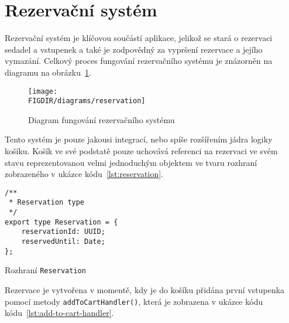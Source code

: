 \pagebreak
\section{Rezervační systém}
\label{sec:implementace-rezervace}
Rezervační systém je klíčovou součástí aplikace, jelikož se stará o rezervaci sedadel a vstupenek a také je zodpovědný za vypršení rezervace a jejího vymazání.
Celkový proces fungování rezervačního systému je znázorněn na diagramu na obrázku~\ref{fig:reservation-system-diagram}.

\begin{figure}[H]
    \centering
    \caption{Diagram fungování rezervačního systému}
    \texttt{[image: \\FIGDIR/diagrams/reservation]}
    \source{}
    \label{fig:reservation-system-diagram}
\end{figure}

Tento systém je pouze jakousi integrací, nebo spíše rozšířením jádra logiky košíku.
Košík ve své podstatě pouze uchovává referenci na rezervaci ve svém stavu reprezentovanou velmi jednoduchým objektem ve tvaru rozhraní zobrazeného v ukázce kódu~\ref{lst:reservation}.

\begin{listing}[H]
    \begin{verbatim}
/**
 * Reservation type
 */
export type Reservation = {
	reservationId: UUID;
	reservedUntil: Date;
};
    \end{verbatim}
    \caption{Rozhraní \texttt{Reservation}}
    \label{lst:reservation}
\end{listing}

Rezervace je vytvořena v momentě, kdy je do košíku přidána první vstupenka pomocí metody \texttt{addToCartHandler()}, která je zobrazena v ukázce kódu kódu~\ref{lst:add-to-cart-handler}.

